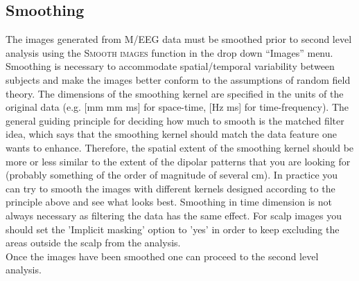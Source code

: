\subsection{Smoothing}
The images generated from M/EEG data must be smoothed prior to second level analysis using the \textsc{Smooth images} function in the drop down ``Images'' menu. Smoothing is necessary to accommodate spatial/temporal variability between subjects and make the images better conform to the assumptions of random field theory. The dimensions of the smoothing kernel are specified in the units of the original data (e.g. [mm mm ms] for space-time, [Hz ms] for time-frequency). The general guiding principle for deciding how much to smooth is the matched filter idea, which says that the smoothing kernel should match the data feature one wants to enhance. Therefore, the spatial extent of the smoothing kernel should be more or less similar to the extent of the dipolar patterns that you are looking for (probably something of the order of magnitude of several cm).  In practice you can try to smooth the images with different kernels designed according to the principle above and see what looks best. Smoothing in time dimension is not always necessary as filtering the data has the same effect. For scalp images you should set the 'Implicit masking' option to 'yes' in order to keep excluding the areas outside the scalp from the analysis.
\\

Once the images have been smoothed one can proceed to the second level analysis.